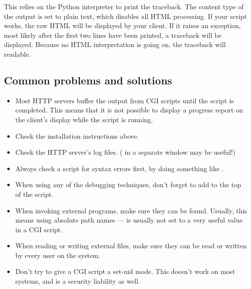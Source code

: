 This relies on the Python interpreter to print the traceback.  The
content type of the output is set to plain text, which disables all
HTML processing.  If your script works, the raw HTML will be displayed
by your client.  If it raises an exception, most likely after the
first two lines have been printed, a traceback will be displayed.
Because no HTML interpretation is going on, the traceback will
readable.


\subsection{Common problems and solutions}

\begin{itemize}
\item Most HTTP servers buffer the output from CGI scripts until the
script is completed.  This means that it is not possible to display a
progress report on the client's display while the script is running.

\item Check the installation instructions above.

\item Check the HTTP server's log files.  ( in a
separate window may be useful!)

\item Always check a script for syntax errors first, by doing something
like .

\item When using any of the debugging techniques, don't forget to add
 to the top of the script.

\item When invoking external programs, make sure they can be found.
Usually, this means using absolute path names ---  is
usually not set to a very useful value in a CGI script.

\item When reading or writing external files, make sure they can be read
or written by every user on the system.

\item Don't try to give a CGI script a set-uid mode.  This doesn't work on
most systems, and is a security liability as well.
\end{itemize}

